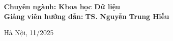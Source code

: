 \begin{center}
  \vspace{0.8cm}
  \textbf{Chuyên ngành: Khoa học Dữ liệu} \\

  \vspace{1.6cm}
  \textbf{Giảng viên hướng dẫn:} \textbf{TS. Nguyễn Trung Hiếu}

  \vspace{2cm}
  \fontsize{14pt}{17pt}\selectfont Hà Nội, 11/2025
\end{center}

\cleardoublepage
